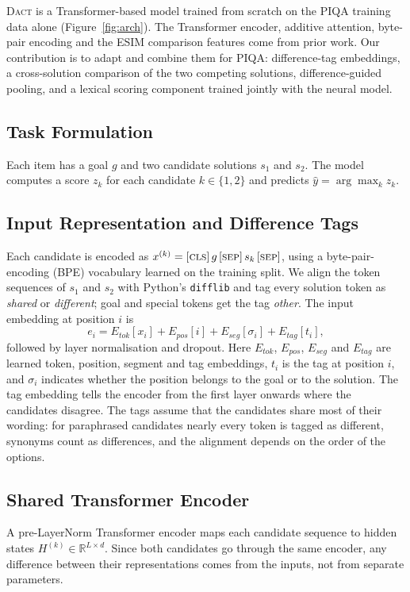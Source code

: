 \documentclass[11pt]{article}
\newcommand{\dact}{\textsc{Dact}}
\begin{document}
\dact{} is a Transformer-based model trained from scratch on the PIQA training data alone (Figure~\ref{fig:arch}). The Transformer encoder, additive attention, byte-pair encoding and the ESIM comparison features come from prior work. Our contribution is to adapt and combine them for PIQA: difference-tag embeddings, a cross-solution comparison of the two competing solutions, difference-guided pooling, and a lexical scoring component trained jointly with the neural model.

\subsection{Task Formulation}
Each item has a goal $g$ and two candidate solutions $s_1$ and $s_2$. The model computes a score $z_k$ for each candidate $k \in \{1,2\}$ and predicts $\hat{y} = \arg\max_k z_k$.

\subsection{Input Representation and Difference Tags}
Each candidate is encoded as $x^{(k)} = [\textsc{cls}]\,g\,[\textsc{sep}]\,s_k\,[\textsc{sep}]$, using a byte-pair-encoding (BPE) vocabulary \cite{sennrich2016bpe} learned on the training split. We align the token sequences of $s_1$ and $s_2$ with Python's \texttt{difflib} and tag every solution token as \textit{shared} or \textit{different}; goal and special tokens get the tag \textit{other}. The input embedding at position $i$ is
\begin{equation}
e_i = E_{tok}[x_i] + E_{pos}[i] + E_{seg}[\sigma_i] + E_{tag}[t_i],
\end{equation}
followed by layer normalisation and dropout. Here $E_{tok}$, $E_{pos}$, $E_{seg}$ and $E_{tag}$ are learned token, position, segment and tag embeddings, $t_i$ is the tag at position $i$, and $\sigma_i$ indicates whether the position belongs to the goal or to the solution. The tag embedding tells the encoder from the first layer onwards where the candidates disagree. The tags assume that the candidates share most of their wording: for paraphrased candidates nearly every token is tagged as different, synonyms count as differences, and the alignment depends on the order of the options.

\subsection{Shared Transformer Encoder}
A pre-LayerNorm Transformer encoder \cite{vaswani2017attention,xiong2020layer} maps each candidate sequence to hidden states $H^{(k)} \in \mathbb{R}^{L \times d}$. Since both candidates go through the same encoder, any difference between their representations comes from the inputs, not from separate parameters.
\end{document}
